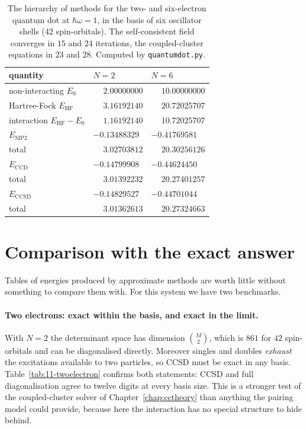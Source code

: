 \begin{table}[h]
\centering
\renewcommand{\arraystretch}{1.25}
\setlength{\tabcolsep}{14pt}
\begin{tabular}{lll}
\toprule
quantity & $N=2$ & $N=6$\\
\midrule
non-interacting $E_0$ & $\phantom{-}2.00000000$ & $\phantom{-}10.00000000$\\
Hartree-Fock $E_{\mathrm{HF}}$ & $\phantom{-}3.16192140$ &
  $\phantom{-}20.72025707$\\
\quad interaction $E_{\mathrm{HF}}-E_0$ & $\phantom{-}1.16192140$ &
  $\phantom{-}10.72025707$\\
\midrule
$E_{\mathrm{MP2}}$ & $-0.13488329$ & $-0.41769581$\\
\quad total & $\phantom{-}3.02703812$ & $\phantom{-}20.30256126$\\
$E_{\mathrm{CCD}}$ & $-0.14799908$ & $-0.44624450$\\
\quad total & $\phantom{-}3.01392232$ & $\phantom{-}20.27401257$\\
$E_{\mathrm{CCSD}}$ & $-0.14829527$ & $-0.44701044$\\
\quad total & $\phantom{-}3.01362613$ & $\phantom{-}20.27324663$\\
\bottomrule
\end{tabular}
\caption{The hierarchy of methods for the two- and six-electron quantum dot at
$\hbar\omega=1$, in the basis of six oscillator shells ($42$ spin-orbitals).
The self-consistent field converges in $15$ and $24$ iterations, the
coupled-cluster equations in $23$ and $28$.  Computed by
\texttt{quantumdot.py}.}
\label{tab:11-hierarchy}
\end{table}

\section{Comparison with the exact answer}
\label{sec:qdexact}

Tables of energies produced by approximate methods are worth little without
something to compare them with.  For this system we have two benchmarks.

\paragraph{Two electrons: exact within the basis, and exact in the limit.}
With $N=2$ the determinant space has dimension $\binom{M}{2}$, which is $861$
for $42$ spin-orbitals and can be diagonalised directly.  Moreover singles and
doubles \emph{exhaust} the excitations available to two particles, so CCSD
must be exact in any basis.  Table~\ref{tab:11-twoelectron} confirms both
statements: CCSD and full diagonalisation agree to twelve digits at every
basis size.  This is a stronger test of the coupled-cluster solver of
Chapter~\ref{chap:cctheory} than anything the pairing model could provide,
because here the interaction has no special structure to hide behind.

